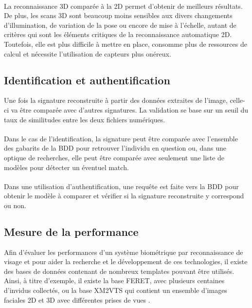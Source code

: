 \paragraph{}
La reconnaissance 3D comparée à la 2D permet d'obtenir de meilleurs résultats.
\\
De plus, les scans 3D sont beaucoup moins sensibles aux divers changements d’illumination, de variation de la pose ou encore de mise à l’échelle, autant de critères qui sont les éléments critiques de la reconnaissance automatique 2D.
\\
Toutefois, elle est plus difficile à mettre en place, consomme plus de ressources de calcul et nécessite l'utilisation de capteurs plus onéreux.

\subsection{Identification et authentification}\label{id-vs-auth}
Une fois la signature reconstruite à partir des données extraites de l'image, celle-ci va être comparée avec d'autres signatures. La validation se base sur un seuil du taux de similitudes entre les deux fichiers numériques.
\paragraph{}Dans le cas de l'identification, la signature peut être comparée avec l'ensemble des gabarits de la BDD pour retrouver l'individu en question ou, dans une optique de recherches, elle peut être comparée avec seulement une liste de modèles pour détecter un éventuel match.
\paragraph{}Dans une utilisation d'authentification, une requête est faite vers la BDD pour obtenir le modèle à comparer et vérifier si la signature reconstruite y correspond ou non.
\subsection{Mesure de la performance}
Afin d'évaluer les performances d'un système biométrique par reconnaissance de visage et pour aider la recherche et le développement de ces technologies, il existe des bases de données contenant de nombreux templates pouvant être utilisés. Ainsi, à titre d'exemple, il existe la base FERET, avec plusieurs centaines d'invidus collectés, ou la base XM2VTS qui contient un ensemble d'images faciales 2D et 3D avec différentes prises de vues \cite{Xphdthesis_3}.


